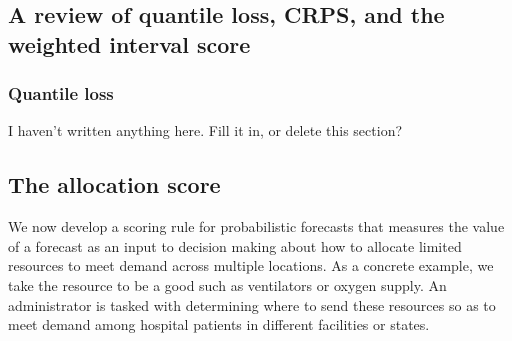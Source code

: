 \documentclass{article}
\begin{document}

\subsection{A review of quantile loss, CRPS, and the weighted interval score}
\label{sec:methods.quantileloss}

\subsubsection{Quantile loss}


I haven't written anything here.  Fill it in, or delete this section?




\subsection{The allocation score}
\label{sec:methods.allocation}

We now develop a scoring rule for probabilistic forecasts that measures the value of a forecast as an input to decision making about how to allocate limited resources to meet demand across multiple locations. As a concrete example, we take the resource to be a good such as ventilators or oxygen supply. An administrator is tasked with determining where to send these resources so as to meet demand among hospital patients in different facilities or states.
\end{document}
